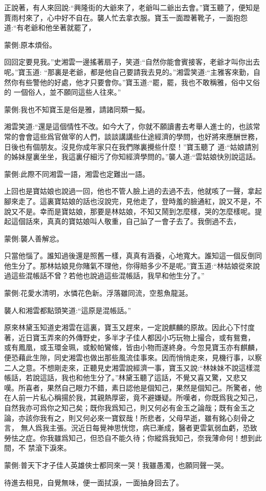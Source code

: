 \begin{parag}
    正說著，有人來回說:“興隆街的大爺來了，老爺叫二爺出去會。”寶玉聽了，便知是賈雨村來了，心中好不自在。襲人忙去拿衣服。寶玉一面蹬著靴子，一面抱怨道:“有老爺和他坐著就罷了，\begin{note}蒙側:原本煩俗。\end{note}回回定要見我。”史湘雲一邊搖著扇子，笑道:“自然你能會賓接客，老爺才叫你出去呢。”寶玉道: “那裏是老爺，都是他自己要請我去見的。”湘雲笑道:“主雅客來勤，自然你有些警他的好處，他才只要會你。”寶玉道:“罷，罷，我也不敢稱雅，俗中又俗的 一個俗人，並不願同這些人往來。”\begin{note}蒙側:我也不知寶玉是俗是雅，請諸同類一擬。\end{note}湘雲笑道:“還是這個情性不改。如今大了，你就不願讀書去考舉人進士的，也該常常的會會這些爲官做宰的人們，談談講講些仕途經濟的學問，也好將來應酬世務，日後也有個朋友。沒見你成年家只在我們隊裏攪些什麼！”寶玉聽了 道:“姑娘請別的姊妹屋裏坐坐，我這裏仔細污了你知經濟學問的。”襲人道:“雲姑娘快別說這話。\begin{note}蒙側:此際不同湘雲一語，湘雲也定難出一語。\end{note}上回也是寶姑娘也說過一回，他也不管人臉上過的去過不去，他就咳了一聲，拿起腳來走了。這裏寶姑娘的話也沒說完，見他走了，登時羞的臉通紅，說又不是，不說又不是。幸而是寶姑娘，那要是林姑娘，不知又鬧到怎麼樣，哭的怎麼樣呢。提起這個話來，真真的寶姑娘叫人敬重，自己訕了一會子去了。我倒過不去，\begin{note}蒙側:襲人善解忿。\end{note}只當他惱了。誰知過後還是照舊一樣，真真有涵養，心地寬大。誰知這一個反倒同他生分了。那林姑娘見你賭氣不理他，你得賠多少不是呢。”寶玉道:“林姑娘從來說過這些混帳話不曾？若他也說過這些混帳話，我早和他生分了。”\begin{note}蒙側:花愛水清明，水憐花色新。浮落雖同流，空惹魚龍涎。\end{note}襲人和湘雲都點頭笑道:“這原是混帳話。”
\end{parag}


\begin{parag}
    原來林黛玉知道史湘雲在這裏，寶玉又趕來，一定說麒麟的原故。因此心下忖度著，近日寶玉弄來的外傳野史，多半才子佳人都因小巧玩物上撮合，或有鴛鴦， 或有鳳凰，或玉環金珮，或鮫帕鸞絛，皆由小物而遂終身。今忽見寶玉亦有麒麟，便恐藉此生隙，同史湘雲也做出那些風流佳事來。因而悄悄走來，見機行事，以察二人之意。不想剛走來，正聽見史湘雲說經濟一事，寶玉又說:“林妹妹不說這樣混帳話，若說這話，我也和他生分了。”林黛玉聽了這話，不覺又喜又驚，又悲又 嘆。所喜者，果然自己眼力不錯，素日認他是個知己，果然是個知己。所驚者，他在人前一片私心稱揚於我，其親熱厚密，竟不避嫌疑。所嘆者，你既爲我之知己， 自然我亦可爲你之知己矣；既你我爲知己，則又何必有金玉之論哉；既有金玉之論，亦該你我有之，則又何必來一寶釵哉！所悲者，父母早逝，雖有銘心刻骨之言， 無人爲我主張。況近日每覺神思恍惚，病已漸成，醫者更雲氣弱血虧，恐致勞怯之症。你我雖爲知己，但恐自不能久待；你縱爲我知己，奈我薄命何！想到此間，不 禁滾下淚來。\begin{note}蒙側:普天下才子佳人英雄俠士都同來一哭！我雖愚濁，也願同聲一哭。\end{note}待進去相見，自覺無味，便一面拭淚，一面抽身回去了。
\end{parag}


